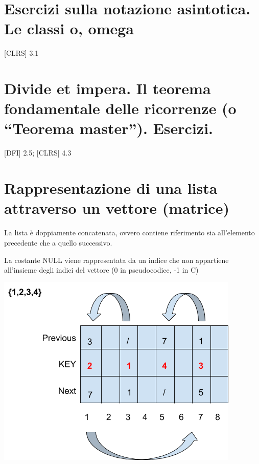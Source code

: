 \documentclass{article}
\begin{document}
{}

{}

{}

\hypertarget{h.tn5j57miv2l8}{\section{\texorpdfstring{{Esercizi sulla
notazione asintotica. Le classi o,
omega}}{Esercizi sulla notazione asintotica. Le classi o, omega}}\label{h.tn5j57miv2l8}}

{{[}CLRS{]} 3.1}

{}

{}

\hypertarget{h.qp9ilz1tito1}{\section{\texorpdfstring{{Divide et impera.
Il teorema fondamentale delle ricorrenze (o ``Teorema master'').
Esercizi.}}{Divide et impera. Il teorema fondamentale delle ricorrenze (o Teorema master). Esercizi.}}\label{h.qp9ilz1tito1}}

{{[}DFI{]} 2.5; {[}CLRS{]} 4.3}

{}

{}

{}

\hypertarget{h.a5tr7osf4zwh}{\section{\texorpdfstring{{Rappresentazione
di una lista attraverso un vettore
(matrice)}}{Rappresentazione di una lista attraverso un vettore (matrice)}}\label{h.a5tr7osf4zwh}}

{}

{La lista è doppiamente concatenata, ovvero contiene riferimento sia
all'elemento precedente che a quello successivo.}

{}

{La costante NULL viene rappresentata da un indice che non appartiene
all'insieme degli indici del vettore (0 in pseudocodice, -1 in C)}

{}

{\includegraphics{images/image520.png}}
\end{document}
